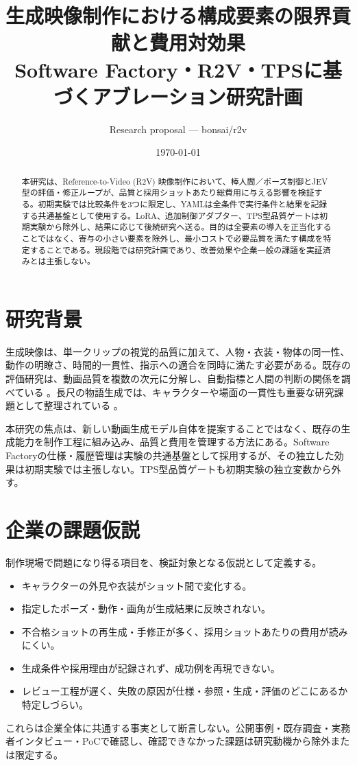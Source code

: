 \documentclass[11pt,a4paper]{article}
\title{生成映像制作における構成要素の限界貢献と費用対効果\\
\large Software Factory・R2V・TPSに基づくアブレーション研究計画}
\author{Research proposal --- bonsai/r2v}
\date{\today}
\begin{document}
\maketitle

\begin{abstract}
本研究は、Reference-to-Video (R2V) 映像制作において、棒人間／ポーズ制御とJEV型の評価・修正ループが、品質と採用ショットあたり総費用に与える影響を検証する。初期実験では比較条件を3つに限定し、YAMLは全条件で実行条件と結果を記録する共通基盤として使用する。LoRA、追加制御アダプター、TPS型品質ゲートは初期実験から除外し、結果に応じて後続研究へ送る。目的は全要素の導入を正当化することではなく、寄与の小さい要素を除外し、最小コストで必要品質を満たす構成を特定することである。現段階では研究計画であり、改善効果や企業一般の課題を実証済みとは主張しない。
\end{abstract}

\section{研究背景}
生成映像は、単一クリップの視覚的品質に加えて、人物・衣装・物体の同一性、動作の明瞭さ、時間的一貫性、指示への適合を同時に満たす必要がある。既存の評価研究は、動画品質を複数の次元に分解し、自動指標と人間の判断の関係を調べている \cite{huang2024vbench,liu2024evalcrafter,han2025videobench,podstawski2025fcb}。長尺の物語生成では、キャラクターや場面の一貫性も重要な研究課題として整理されている \cite{elmoghany2025longvid}。

本研究の焦点は、新しい動画生成モデル自体を提案することではなく、既存の生成能力を制作工程に組み込み、品質と費用を管理する方法にある。Software Factoryの仕様・履歴管理は実験の共通基盤として採用するが、その独立した効果は初期実験では主張しない。TPS型品質ゲートも初期実験の独立変数から外す。

\section{企業の課題仮説}
制作現場で問題になり得る項目を、検証対象となる仮説として定義する。
\begin{itemize}[nosep]
\item キャラクターの外見や衣装がショット間で変化する。
\item 指定したポーズ・動作・画角が生成結果に反映されない。
\item 不合格ショットの再生成・手修正が多く、採用ショットあたりの費用が読みにくい。
\item 生成条件や採用理由が記録されず、成功例を再現できない。
\item レビュー工程が遅く、失敗の原因が仕様・参照・生成・評価のどこにあるか特定しづらい。
\end{itemize}
これらは企業全体に共通する事実として断言しない。公開事例・既存調査・実務者インタビュー・PoCで確認し、確認できなかった課題は研究動機から除外または限定する。
\end{document}
